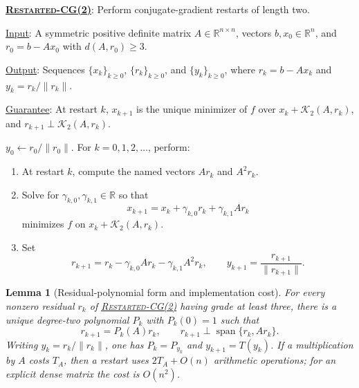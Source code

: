 \documentclass[11pt]{article}
\newenvironment{fminipage}%
  {\begin{Sbox}\begin{minipage}}%
  {\end{minipage}\end{Sbox}\fbox{\TheSbox}}
\newenvironment{algbox}[0]{%
\vskip 0.2in
\noindent
\begin{fminipage}{6.3in}
}{%
\end{fminipage}
\vskip 0.2in
}
\newtheorem{lemma}{Lemma}[section]
\begin{document}
\begin{algbox}
\textbf{\uline{\textsc{Restarted-CG(2)}}}: Perform conjugate-gradient
restarts of length two.
\label{alg:restarted-cg2}

\uline{Input}: A symmetric positive definite matrix
\(A\in\mathbb R^{n\times n}\), vectors \(b,x_0\in\mathbb R^n\), and
\(r_0=b-Ax_0\) with \(d(A,r_0)\geq3\).

\uline{Output}: Sequences \(\{x_k\}_{k\geq0}\),
\(\{r_k\}_{k\geq0}\), and
\(\{y_k\}_{k\geq0}\), where \(r_k=b-Ax_k\) and
\(y_k=r_k/\lVert r_k\rVert\).

\uline{Guarantee}: At restart \(k\), \(x_{k+1}\) is the unique minimizer of
\(f\) over \(x_k+\mathcal K_2(A,r_k)\), and
\(r_{k+1}\perp\mathcal K_2(A,r_k)\).

\(y_0\gets r_0/\lVert r_0\rVert\).  For \(k=0,1,2,\ldots\), perform:
\begin{enumerate}[leftmargin=*]
  \item At restart \(k\), compute the named vectors \(Ar_k\) and
  \(A^2r_k\).
  \item Solve for \(\gamma_{k,0},\gamma_{k,1}\in\mathbb R\) so that
  \[
    x_{k+1}=x_k+\gamma_{k,0}r_k+\gamma_{k,1}Ar_k
  \]
  minimizes \(f\) on \(x_k+\mathcal K_2(A,r_k)\).
  \item Set
  \[
    r_{k+1}=r_k-\gamma_{k,0}Ar_k-\gamma_{k,1}A^2r_k,
    \qquad
    y_{k+1}=\frac{r_{k+1}}{\lVert r_{k+1}\rVert}.
  \]
\end{enumerate}
\end{algbox}

\begin{lemma}[Residual-polynomial form and implementation cost]
\label{lem:iteration-equivalence}
For every nonzero residual \(r_k\) of
\hyperref[alg:restarted-cg2]{\textsc{Restarted-CG(2)}} having grade at least
three, there is a unique degree-two polynomial \(P_k\) with \(P_k(0)=1\)
such that
\[
 r_{k+1}=P_k(A)r_k,\qquad
 r_{k+1}\perp\operatorname{span}\{r_k,Ar_k\}.
\]
Writing \(y_k=r_k/\lVert r_k\rVert\), one has
\(P_k=P_{y_k}\) and \(y_{k+1}=T(y_k)\).  If a multiplication by \(A\)
costs \(T_A\), then a restart uses \(2T_A+O(n)\) arithmetic operations;
for an explicit dense matrix the cost is \(O(n^2)\).
\end{lemma}
\end{document}
